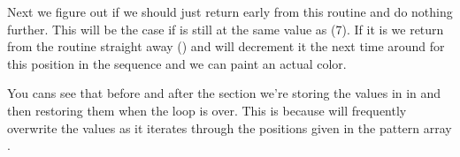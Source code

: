 Next we figure out if we should just return early from this routine and do nothing further. This will be the
case if  is still at the same value as  (7). If it is
we return from the routine straight away () and
 will decrement it the next time around for this position
in the sequence and we can paint an actual color.

You cans see that before and after the  section we're storing the values in  in
 and then restoring them when the loop is over. This is because 
will frequently overwrite the values as it iterates through the positions given in the pattern array .


